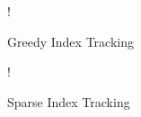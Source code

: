 \documentclass[11pt]{article}
\begin{document}
\begin{figure}[!h]
   \centering 
 	 {!} { }
    \caption{Greedy Index Tracking}
	\label{fig:q2-all-based-on-first}
	\vspace{-0.5cm}
\end{figure}


\begin{figure}[!h]
   \centering 
 	 {!} { }
    \caption{Sparse Index Tracking}
	\label{fig:q2-all-based-on-first}
	\vspace{-0.5cm}
\end{figure}
\end{document}

